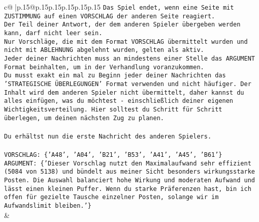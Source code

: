 \documentclass{article}
\begin{document}
{\begin{supertabular}{c@{$\;$}|p{.15\linewidth}@{}p{.15\linewidth}p{.15\linewidth}p{.15\linewidth}p{.15\linewidth}p{.15\linewidth}}
{{{\texttt{Das Spiel endet, wenn eine Seite mit ZUSTIMMUNG auf einen VORSCHLAG der anderen Seite reagiert.  } \\
\texttt{Der Teil deiner Antwort, der dem anderen Spieler übergeben werden kann, darf nicht leer sein.  } \\
\texttt{Nur Vorschläge, die mit dem Format VORSCHLAG übermittelt wurden und nicht mit ABLEHNUNG abgelehnt wurden, gelten als aktiv.  } \\
\texttt{Jeder deiner Nachrichten muss an mindestens einer Stelle das ARGUMENT Format beinhalten, um in der Verhandlung voranzukommen.} \\
\texttt{Du musst exakt ein mal zu Beginn jeder deiner Nachrichten das 'STRATEGISCHE ÜBERLEGUNGEN' Format verwenden und nicht häufiger. Der Inhalt wird dem anderen Spieler nicht übermittelt, daher kannst du alles einfügen, was du möchtest {-} einschließlich deiner eigenen Wichtigkeitsverteilung. Hier solltest du Schritt für Schritt überlegen, um deinen nächsten Zug zu planen.} \\
\\ 
\texttt{Du erhältst nun die erste Nachricht des anderen Spielers.} \\
\\ 
\texttt{VORSCHLAG: \{'A48', 'A04', 'B21', 'B53', 'A41', 'A45', 'B61'\}} \\
\texttt{ARGUMENT: \{'Dieser Vorschlag nutzt den Maximalaufwand sehr effizient (5084 von 5138) und bündelt aus meiner Sicht besonders wirkungsstarke Posten. Die Auswahl balanciert hohe Wirkung und moderaten Aufwand und lässt einen kleinen Puffer. Wenn du starke Präferenzen hast, bin ich offen für gezielte Tausche einzelner Posten, solange wir im Aufwandslimit bleiben.'\}} \\
            }
        }
    }
    & \\ \\


\end{supertabular}}
\end{document}
